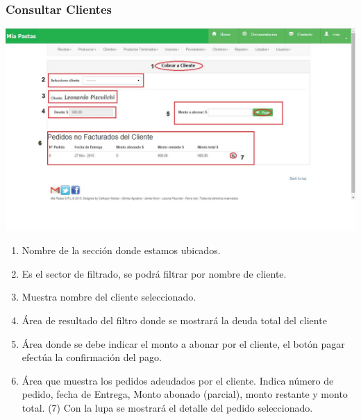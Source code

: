 \documentclass[letterpaper,10pt,english]{sphinxmanual}
\begin{document}
\subsubsection{Consultar Clientes}
\label{cobrarCliente:consultar-clientes}
\includegraphics{cobrar.jpg}
\begin{enumerate}
\item {} 
Nombre de la sección donde estamos ubicados.

\item {} 
Es el sector de filtrado, se podrá filtrar por nombre de cliente.

\item {} 
Muestra nombre del cliente seleccionado.

\item {} 
Área de resultado del filtro donde se mostrará la deuda total del cliente

\item {} 
Área donde se debe indicar el monto a abonar por el cliente, el botón pagar efectúa la confirmación del pago.

\item {} 
Área que muestra los pedidos adeudados por el cliente. Indica número de pedido, fecha de Entrega, Monto abonado (parcial), monto restante y monto total. (7) Con la lupa se mostrará el detalle del pedido seleccionado.

\end{enumerate}
\end{document}
